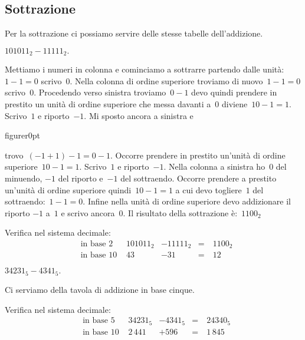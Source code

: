 \ovalbox{\risolvii \ref{ese:4.21}, \ref{ese:4.22}, \ref{ese:4.23}}
\pagebreak
\subsection{Sottrazione}

Per la sottrazione ci possiamo servire delle stesse tabelle
dell'addizione.

\begin{exrig}
\begin{esempio}
$101011_{2}-11111_{2}.$
\end{esempio}

Mettiamo i numeri in colonna e cominciamo a sottrarre partendo dalle
unità:~$1-1=0$ scrivo~$0$.
Nella colonna di ordine superiore troviamo di nuovo~$1-1=0$ scrivo~$0$.
Procedendo verso sinistra troviamo~$0-1$ devo quindi prendere in prestito
un unità di ordine superiore che messa davanti a~0 diviene~$10-1=1$.
Scrivo~$1$ e riporto~$-1$. Mi sposto ancora a sinistra e
\begin{wrapfloat}{figure}{r}{0pt}
 
\end{wrapfloat}
trovo~$(-1+1)-1=0-1$. Occorre prendere in
prestito un'unità di ordine superiore~$10-1=1$.
Scrivo~$1$ e riporto~$-1$.
Nella colonna a sinistra ho~$0$ del minuendo, $-1$ del riporto e~$-1$
del sottraendo. Occorre prendere a prestito un'unità
di ordine superiore quindi~$10-1=1$ a cui devo togliere~$1$ del
sottraendo:~$1-1=0$.
Infine nella unità di ordine superiore devo addizionare il riporto
$-1$ a~$1$ e scrivo ancora~$0$. Il risultato della sottrazione è:~$1100_2$

Verifica nel sistema decimale: %
\begin{align*}
&\text{in base 2 }&101011_{2}&-11111_{2}&=&~1100_{2}\\
&\text{in base 10 }&43&-31&=&~12
\end{align*}


\begin{esempio}
$34231_{5}-4341_{5}.$

Ci serviamo della tavola di addizione in base cinque.
\begin{center}
 
\end{center}
Verifica nel sistema decimale: %
\begin{align*}
&\text{in base 5 }&34231_{5}&-4341_{5}&=&~24340_{5}\\
&\text{in base 10 }&2\,441&+596&=&~1\,845
\end{align*}
\end{esempio}
\end{exrig}

